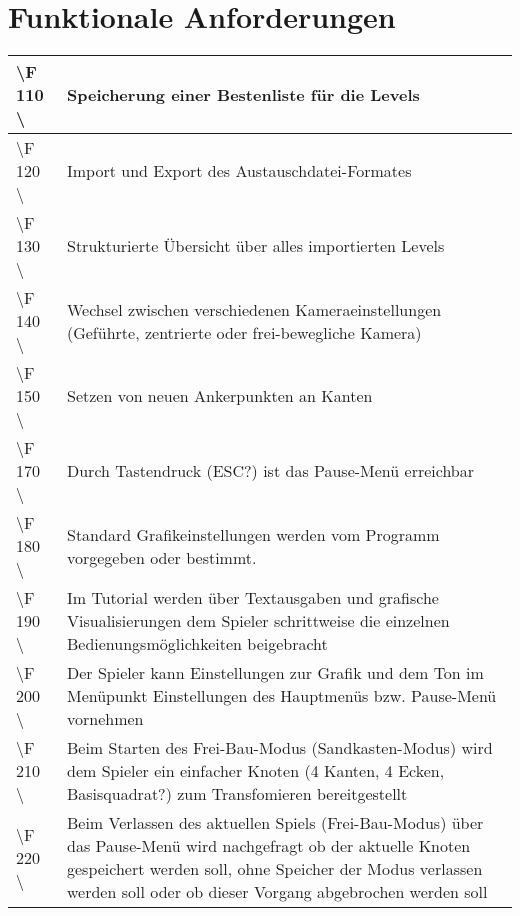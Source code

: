 \chapter{Funktionale Anforderungen}


\begin{tabular}{|p{}|p{}|}
\hline 
\textbackslash F 110  \textbackslash & Speicherung einer Bestenliste für die Levels \\ 
\hline 
\textbackslash F 120  \textbackslash  & Import und Export des Austauschdatei-Formates \\ 
\hline 
\textbackslash F 130  \textbackslash  & Strukturierte Übersicht über alles importierten Levels \\ 
\hline
\textbackslash F 140  \textbackslash  & Wechsel zwischen verschiedenen Kameraeinstellungen (Geführte, zentrierte oder frei-bewegliche Kamera)  \\ 
\hline
\textbackslash F 150  \textbackslash  & Setzen von neuen Ankerpunkten an Kanten \\ 
\hline
\textbackslash F 170  \textbackslash  & Durch Tastendruck (ESC?) ist das Pause-Menü erreichbar\\ 
\hline
\textbackslash F 180  \textbackslash  & Standard Grafikeinstellungen werden vom Programm vorgegeben oder bestimmt.\\ 
\hline
\textbackslash F 190  \textbackslash  & Im Tutorial werden über Textausgaben und grafische Visualisierungen dem Spieler schrittweise die einzelnen Bedienungsmöglichkeiten beigebracht  \\
\hline
\textbackslash F 200  \textbackslash  & Der Spieler kann Einstellungen zur Grafik und dem Ton im Menüpunkt Einstellungen des Hauptmenüs bzw. Pause-Menü vornehmen\\
\hline
\textbackslash F 210  \textbackslash  & Beim Starten des Frei-Bau-Modus (Sandkasten-Modus) wird dem Spieler ein einfacher Knoten (4 Kanten, 4 Ecken, Basisquadrat?) zum Transfomieren bereitgestellt \\
\hline
\textbackslash F 220  \textbackslash  & Beim Verlassen des aktuellen Spiels (Frei-Bau-Modus) über das Pause-Menü wird nachgefragt ob der aktuelle Knoten gespeichert werden soll, ohne Speicher der Modus verlassen werden soll oder ob dieser Vorgang abgebrochen werden soll\\ %

\end{tabular}
